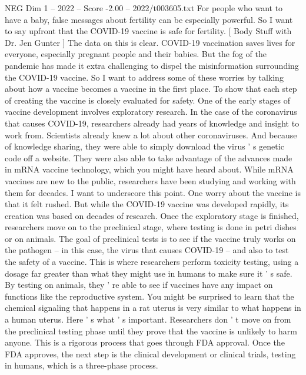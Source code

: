 \begin{textsample}{NEG Dim 1 – 2022 – Score -2.00 – 2022/t003605.txt}  \label{ex:f1_neg_011}
For people who want to have a baby, false messages about fertility can be especially powerful.
So I want to say upfront that the COVID-19 vaccine is safe for fertility. [ Body Stuff with Dr.
Jen Gunter ] The data on this is clear.
COVID-19 vaccination saves lives for everyone, especially pregnant people and their babies.
But the fog of the pandemic has made it extra challenging to dispel the misinformation surrounding the COVID-19 vaccine.
So I want to address some of these worries by talking about how a vaccine becomes a vaccine in the first place.
To show that each step of creating the vaccine is closely evaluated for safety.
One of the early stages of vaccine development involves exploratory research.
In the case of the coronavirus that causes COVID-19, researchers already had years of knowledge and insight to work from.
Scientists already knew a lot about other coronaviruses.
And because of knowledge sharing, they were able to simply download the virus ' s genetic code off a website.
They were also able to take advantage of the advances made in mRNA vaccine technology, which you might have heard about.
While mRNA vaccines are new to the public, researchers have been studying and working with them for decades.
I want to underscore this point.
One worry about the vaccine is that it felt rushed.
But while the COVID-19 vaccine was developed rapidly, its creation was based on decades of research.
Once the exploratory stage is finished, researchers move on to the preclinical stage, where testing is done in petri dishes or on animals.
The goal of preclinical tests is to see if the vaccine truly works on the pathogen -- in this case, the virus that causes COVID-19 -- and also to test the safety of a vaccine.
This is where researchers perform toxicity testing, using a dosage far greater than what they might use in humans to make sure it ' s safe.
By testing on animals, they ' re able to see if vaccines have any impact on functions like the reproductive system.
You might be surprised to learn that the chemical signaling that happens in a rat uterus is very similar to what happens in a human uterus.
Here ' s what ' s important.
Researchers don ' t move on from the preclinical testing phase until they prove that the vaccine is unlikely to harm anyone.
This is a rigorous process that goes through FDA approval.
Once the FDA approves, the next step is the clinical development or clinical trials, testing in humans, which is a three-phase process.

\end{textsample}
